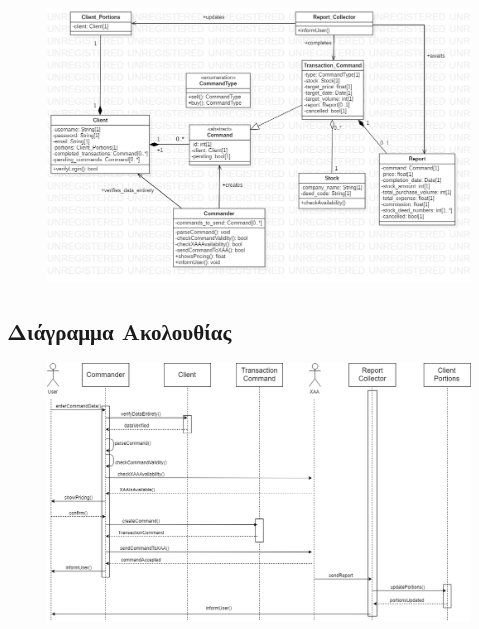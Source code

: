 \documentclass{article}
\begin{document}
\begin{figure}[!h]
	\includegraphics[width=\linewidth]{../UML/command_class_diagram.png}
\end{figure}

\subsection{Διάγραμμα Ακολουθίας}

\begin{figure}[!h]
	\includegraphics[width=14.5cm]{../UML/sequence_diagram.png}
\end{figure}

\newpage
\end{document}

